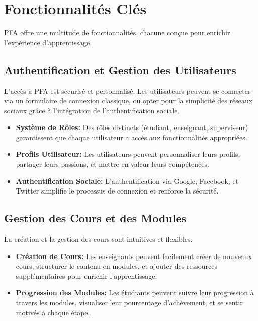 \section{Fonctionnalités Clés}

PFA offre une multitude de fonctionnalités, chacune conçue pour enrichir l'expérience d'apprentissage.

\subsection{Authentification et Gestion des Utilisateurs}

L'accès à PFA est sécurisé et personnalisé. Les utilisateurs peuvent se connecter via un formulaire de connexion classique, ou opter pour la simplicité des réseaux sociaux grâce à l'intégration de l'authentification sociale.

\begin{itemize}
    \item \textbf{Système de Rôles:} Des rôles distincts (étudiant, enseignant, superviseur) garantissent que chaque utilisateur a accès aux fonctionnalités appropriées.
    \item \textbf{Profils Utilisateur:} Les utilisateurs peuvent personnaliser leurs profils, partager leurs passions, et mettre en valeur leurs compétences.
    \item \textbf{Authentification Sociale:} L'authentification via Google, Facebook, et Twitter simplifie le processus de connexion et renforce la sécurité.
\end{itemize}
\newpage
\subsection{Gestion des Cours et des Modules}

La création et la gestion des cours sont intuitives et flexibles.

\begin{itemize}
    \item \textbf{Création de Cours:} Les enseignants peuvent facilement créer de nouveaux cours, structurer le contenu en modules, et ajouter des ressources supplémentaires pour enrichir l'apprentissage.
    \item \textbf{Progression des Modules:} Les étudiants peuvent suivre leur progression à travers les modules, visualiser leur pourcentage d'achèvement, et se sentir motivés à chaque étape.
\end{itemize}

